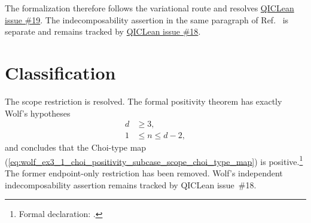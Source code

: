 \documentclass{article}
\begin{document}
The formalization therefore follows the variational route and resolves
\href{https://github.com/LionSR/QICLean/issues/19}{QICLean issue \#19}. The
indecomposability assertion in the same paragraph of
Ref.~\cite{Wolf2012Quantum} is separate and remains tracked by
\href{https://github.com/LionSR/QICLean/issues/18}{QICLean issue \#18}.

\section{Classification}

The scope restriction is resolved. The formal positivity theorem has exactly
Wolf's hypotheses
\begin{align}
    d
        &\geq 3,
    \label{eq:wolf_ex3_1_choi_positivity_subcase_scope_resolved_dimension}\\
    1
        &\leq n\leq d-2,
    \label{eq:wolf_ex3_1_choi_positivity_subcase_scope_resolved_parameter_range}
\end{align}
and concludes that the Choi-type map
(\ref{eq:wolf_ex3_1_choi_positivity_subcase_scope_choi_type_map}) is
positive.\footnote{Formal declaration:
.}
The former endpoint-only restriction has been removed. Wolf's independent
indecomposability assertion remains tracked by QICLean issue~\#18.



\end{document}

